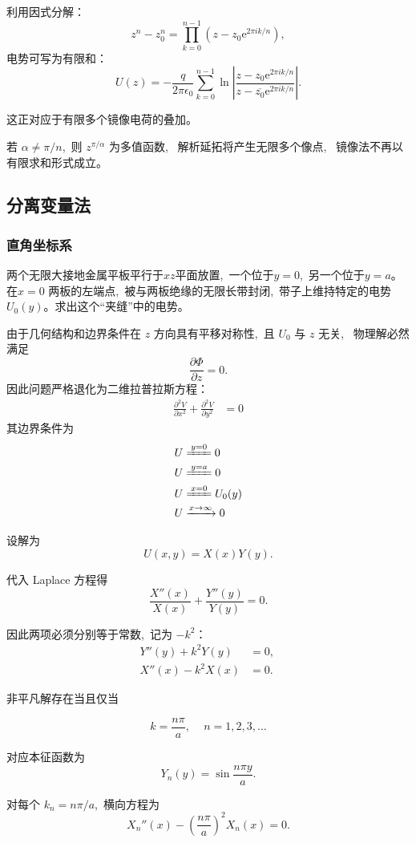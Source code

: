 利用因式分解：
\[
z^n - z_0^n
=
\prod_{k=0}^{n-1}
\left(z - z_0 \mathrm{e}^{2\pi i k/n}\right),
\]
电势可写为有限和：
\[
U(z)
=
-\frac{q}{2\pi\epsilon_0}
\sum_{k=0}^{n-1}
\ln
\left|
\frac{
z - z_0 \mathrm{e}^{2\pi i k/n}
}{
z - \overline{z_0} \mathrm{e}^{2\pi i k/n}
}
\right|.
\]

这正对应于有限多个镜像电荷的叠加。

若 $\alpha \neq \pi/n$, \,则 $z^{\pi/\alpha}$ 为多值函数, \,
解析延拓将产生无限多个像点, \,
镜像法不再以有限求和形式成立。
\subsection{分离变量法}
\subsubsection{直角坐标系}
{两个无限大接地金属平板平行于$xz$平面放置, \,一个位于$y=0$, \,另一个位于$y=a$。在$x=0$
两板的左端点, \,被与两板绝缘的无限长带封闭, \,带子上维持特定的电势$U_0(y)$。求出这个“夹缝”中的电势。}

由于几何结构和边界条件在 $z$ 方向具有平移对称性, \,且 $U_0$ 与 $z$ 无关, \,
物理解必然满足
\[
\frac{\partial\Phi}{\partial z}=0 .
\]
因此问题严格退化为二维拉普拉斯方程：
\begin{align*}
    \frac{\partial^2 V}{\partial x^2}
    +\frac{\partial^2V}{\partial y^2}&=0
\end{align*}
其边界条件为
\begin{align*}
    U&\xlongequal{y=0}0\\
    U&\xlongequal{y=a}0\\
    U&\xlongequal{x=0}U_0(y)\\
    U&\xrightarrow{x\to\infty}0
\end{align*}

设解为
\[
U(x,y)=X(x)Y(y).
\]

代入 Laplace 方程得
\[
\frac{X''(x)}{X(x)} + \frac{Y''(y)}{Y(y)} = 0.
\]

因此两项必须分别等于常数, \,记为 $-k^2$：
\begin{align*}
Y''(y) + k^2 Y(y) &= 0, \,\\
X''(x) - k^2 X(x) &= 0. 
\end{align*}

非平凡解存在当且仅当

\[
k = \frac{n\pi}{a}, \,\quad n=1,2,3,\dots
\]

对应本征函数为
\[
Y_n(y)=\sin\frac{n\pi y}{a}.
\]

对每个 $k_n=n\pi/a$, \,横向方程为
\[
X_n''(x) - \left(\frac{n\pi}{a}\right)^2 X_n(x)=0.
\]

